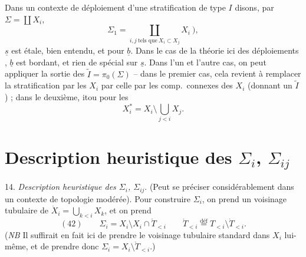 \documentclass[11pt,a4paper]{article}
\begin{document}

Dans un contexte de déploiement d'une stratification de type $I$ disons, par $\Sigma=\coprod X_i$,
\[
\Sigma_1=\coprod_{i,j\ \text{tels que}\ X_i\subset X_j}X_i\ ),
\]
$\underline s$ est étale, bien entendu, et  pour $\underline b$. Dans le cas de la théorie   ici des déploiements , $\underline b$ est bordant, et rien de spécial sur $\underline s$. Dans l'un et l'autre cas, on peut appliquer la sortie des $\widetilde I=\pi_0(\Sigma)$ -- dans le premier cas, cela revient à remplacer la stratification par les $X_i$ par celle par les comp.\ connexes des $X_i$ (donnant un $\widetilde I$) ; dans le deuxième, \struck{\ill{}} itou pour les
\[
X_i^{*}=X_i\setminus\bigcup_{j<i}X_j .
\]

\section*{Description heuristique des $\Sigma_i$, $\Sigma_{ij}$}


14. \emph{Description heuristique des $\Sigma_i$, $\Sigma_{ij}$}. (Peut se préciser considérablement dans un contexte de topologie modérée). Pour construire $\Sigma_i$, on prend un voisinage tubulaire  \struck{\ill{}} de $\dot X_i=\bigcup_{k<i}X_k$, et on prend
\[
(42)\qquad \Sigma_i=X_i\setminus X_i\cap\mathring T_{<i}\qquad \mathring T_{<i}\overset{\text{déf}}{=}T_{<i}\setminus\dot T_{<i} .
\]
(\emph{NB} Il suffirait en fait ici de prendre le voisinage tubulaire standard dans $X_i$ lui-même, et de prendre donc $\Sigma_i=X_i\setminus\mathring T_{<i}$.)

\end{document}
